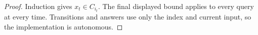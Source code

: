\begin{proof}
Induction gives $x_t\in C_{i_t}$. The final displayed bound applies
to every query at every time. Transitions and answers use only the index
and current input, so the implementation is autonomous.
\end{proof}
